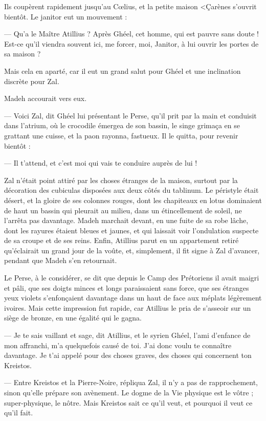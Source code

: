 \documentclass[a4paper, 11pt, oneside, polutonikogreek, french]{article}
\begin{document}
Ils coupèrent rapidement jusqu'au Cœlius, et la petite maison <\c* Carènes s'ouvrit bientôt. Le janitor eut un mouvement :

--- Qu'a le Maître Atillius ? Après Ghéel, cet homme, qui est pauvre sans doute ! Est-ce qu'il viendra souvent ici, me forcer, moi, Janitor, à lui ouvrir les portes de sa maison ?

Mais cela en aparté, car il eut un grand salut pour Ghéel et une inclination discrète pour Zal.

Madeh accourait vers eux.

--- Voici Zal, dit Ghéel lui présentant le Perse, qu'il prit par la main et conduisit dans l'atrium, où le crocodile émergea de son bassin, le singe grimaça en se grattant une cuisse, et la paon rayonna, fastueux. Il le quitta, pour revenir bientôt :

--- Il t'attend, et c'est moi qui vais te conduire auprès de lui !

Zal n'était point attiré par les choses étranges de la maison, surtout par la décoration des cubiculas disposées aux deux côtés du tablinum. Le péristyle était désert, et la gloire de ses colonnes rouges, dont les chapiteaux en lotus dominaient de haut un bassin qui pleurait au milieu, dans un étincellement de soleil, ne l'arrêta pas davantage. Madeh marchait devant, en une fuite de sa robe lâche, dont les rayures étaient bleues et jaunes, et qui laissait voir l'ondulation suspecte de sa croupe et de ses reins. Enfin, Atillius parut en un appartement retiré qu'éclairait un grand jour de la voûte, et, simplement, il fit signe à Zal d'avancer, pendant que Madeh s'en retournait.

Le Perse, à le considérer, se dit que depuis le Camp des Prétoriens il avait maigri et pâli, que ses doigts minces et longs paraissaient sans force, que ses étranges yeux violets s'enfonçaient davantage dans un haut de face aux méplats légèrement ivoires. Mais cette impression fut rapide, car Atillius le pria de s'asseoir sur un siège de bronze, en une égalité qui le gagna.

--- Je te sais vaillant et sage, dit Atillius, et le syrien Ghéel, l'ami d'enfance de mon affranchi, m'a quelquefois causé de toi. J'ai donc voulu te connaître davantage. Je t'ai appelé pour des choses graves, des choses qui concernent ton Kreistos.

--- Entre Kreistos et la Pierre-Noire, répliqua Zal, il n'y a pas de rapprochement, sinon qu'elle prépare son avènement. Le dogme de la Vie physique est le vôtre ; super-physique, le nôtre. Mais Kreistos sait ce qu'il veut, et pourquoi il veut ce qu'il fait.
\end{document}
